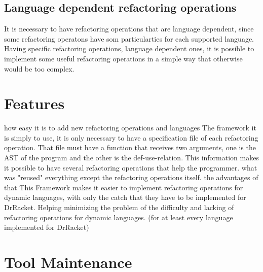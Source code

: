 \subsection{Language dependent refactoring operations}
It is necessary to have refactoring operations that are language dependent, since
some refactoring operatons have som particularties for each supported language.
Having specific refactoring operations, language dependent ones, it is possible
to implement some useful refactoring operations in a simple way that otherwise would
be too complex.
\section{Features}
how easy it is to add new refactoring operations and languages
The framework it is simply to use, it is only necessary to have a specification file
of each refactoring operation.
That file must have a function that receives two arguments,
one is the AST of the program and the other is the def-use-relation.
This information makes it possible to have several refactoring operations that help
the programmer.
what was "reused"
everything except the refactoring operations itself.
the advantages of that
This Framework makes it easier to implement refactoring operations for dynamic languages,
with only the catch that they have to be implemented for DrRacket. Helping minimizing
the problem of the difficulty and lacking of refactoring operations for dynamic languages.
(for at least every language implemented for DrRacket)
\section{Tool Maintenance} %



